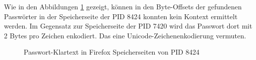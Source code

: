 Wie in den Abbildungen \ref{img:firefox-pw-offset-pid-8424} gezeigt, können in den Byte-Offsets der gefundenen Passwörter in der Speicherseite der PID 8424 konnten kein Kontext ermittelt werden. Im Gegensatz zur Speicherseite der PID 7420 wird das Passwort dort mit 2 Bytes pro Zeichen enkodiert. Das eine Unicode-Zeichenenkodierung vermuten.
\begin{figure}
	\centering
	\hfill
	\label{img:firefox-pw-offset-pid-8424}  
	\caption{Passwort-Klartext in Firefox Speicherseiten von PID 8424}
\end{figure}

